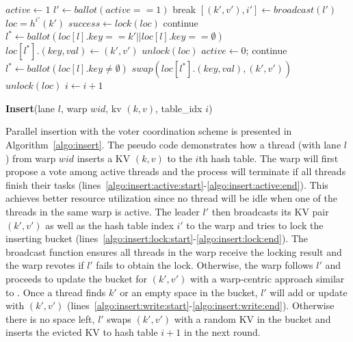 \begin{algorithm}[t]
	\begin{algorithmic}[1]
		\State $active \gets 1$	\label{algo:insert:active:start}
			\State $l' \gets ballot(active == 1)$ \label{algo:insert:vote:start}
				\State break \label{algo:insert:active:end}
			\EndIf
			\State $[(k',v'),i'] \gets broadcast(l')$ \label{algo:insert:lock:start}
			\State $loc = h^{i'}(k')$
				\State $success \gets lock(loc)$ \label{algo:insert:lock:end}
			\EndIf
				\State continue					\label{algo:insert:vote:end}
			\EndIf
			\State $l^* \gets ballot(loc[l].key == k' || loc[l].key ==\emptyset)$ \label{algo:insert:write:start}
				\State $loc[l^*].(key,val) \gets (k',v')$
				\State $unlock(loc)$
				\State $active \gets 0$;
				\State continue			\label{algo:insert:write:end}
			\EndIf
			\State $l^* \gets ballot(loc[l].key \neq \emptyset)$
				\State $swap(loc[l^*].(key,val),(k',v'))$
				\State $unlock(loc)$
				\State $i \gets i+1$
			\EndIf
		\EndWhile
	\end{algorithmic}
	\caption{\textbf{Insert}(lane $l$, warp $wid$, kv $(k,v)$, table\_idx $i$)}\label{algo:insert}
\end{algorithm}

Parallel insertion with the voter coordination scheme is presented in Algorithm~\ref{algo:insert}.
The pseudo code demonstrates how a thread (with lane $l$) from warp $wid$ inserts a KV $(k,v)$ to the $i$th hash table. 
The warp will first propose a vote among active threads and the process will terminate if all threads finish their tasks (lines~\ref{algo:insert:active:start}-\ref{algo:insert:active:end}).  
This achieves better resource utilization since no thread will be idle when one of the threads in the same warp is active.  
The leader $l'$ then broadcasts its KV pair $(k',v')$ as well as the hash table index $i'$ to the warp and tries to lock the inserting bucket (lines~\ref{algo:insert:lock:start}-\ref{algo:insert:lock:end}). 
The broadcast function ensures all threads in the warp receive the locking result and the warp revotes if $l'$ fails to obtain the lock.
Otherwise, the warp follows $l'$ and proceeds to update the bucket for $(k',v')$ with a warp-centric approach similar to .
Once a thread finds $k'$ or an empty space in the bucket, $l'$ will add or update with $(k',v')$ (lines~\ref{algo:insert:write:start}-\ref{algo:insert:write:end}).
Otherwise there is no space left, $l'$ swaps $(k',v')$ with a random KV in the bucket and inserts the evicted KV to hash table $i+1$ in the next round. 


